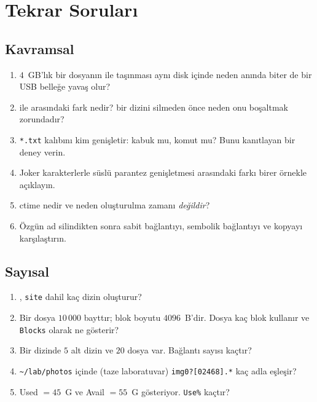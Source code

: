 \section{Tekrar Soruları}

\subsection*{Kavramsal}
\begin{enumerate}[leftmargin=1.6em]
  \item $4$~GB'lık bir dosyanın  ile taşınması aynı disk içinde neden anında biter de bir USB belleğe yavaş olur?
  \item {} ile  arasındaki fark nedir?  bir dizini silmeden önce neden onu boşaltmak zorundadır?
  \item \texttt{*.txt} kalıbını kim genişletir: kabuk mu, komut mu? Bunu kanıtlayan bir deney verin.
  \item Joker karakterlerle süslü parantez genişletmesi arasındaki farkı birer örnekle açıklayın.
  \item ctime nedir ve neden oluşturulma zamanı \emph{değildir}?
  \item Özgün ad silindikten sonra sabit bağlantıyı, sembolik bağlantıyı ve kopyayı karşılaştırın.
\end{enumerate}

\subsection*{Sayısal}
\begin{enumerate}[leftmargin=1.6em,resume]
  \item {}, \texttt{site} dahil kaç dizin oluşturur?
  \item Bir dosya $10\,000$ bayttır; blok boyutu $4096$~B'dir. Dosya kaç blok kullanır ve  \texttt{Blocks} olarak ne gösterir?
  \item Bir dizinde $5$ alt dizin ve $20$ dosya var. Bağlantı sayısı kaçtır?
  \item \texttt{\textasciitilde/lab/photos} içinde (taze laboratuvar) \texttt{img0?[02468].*} kaç adla eşleşir?
  \item {} Used $= 45$~G ve Avail $= 55$~G gösteriyor. \texttt{Use\%} kaçtır?
\end{enumerate}

